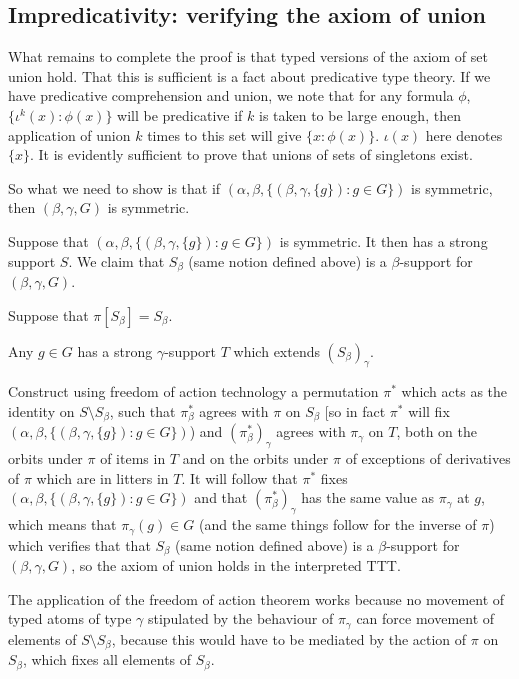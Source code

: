 \documentclass[112pt]{article}
\begin{document}
\newpage
\subsection{Impredicativity:  verifying the axiom of union}

What remains to complete the proof is that typed versions of the axiom of set union hold.  That this is sufficient is a fact about predicative type theory.
If we have predicative comprehension and union, we note that for any formula $\phi$, $\{\iota^k(x):\phi(x)\}$ will be predicative if $k$ is taken to be large enough, then application of union $k$ times to this set will give $\{x:\phi(x)\}$.  $\iota(x)$ here denotes $\{x\}$.  It is evidently sufficient to prove that unions of sets of singletons exist.

So what we need to show is that if $(\alpha,\beta,\{(\beta,\gamma,\{g\}):g \in G\})$ is symmetric, then $(\beta,\gamma,G)$ is symmetric.

Suppose that $(\alpha,\beta,\{(\beta,\gamma,\{g\}):g \in G\})$ is symmetric.  It then has a strong support $S$.  We claim that $S_\beta$ (same notion defined above) is a $\beta$-support for $(\beta,\gamma,G)$.

Suppose that $\pi[S_\beta]=S_\beta$.  

Any $g \in G$ has a strong $\gamma$-support $T$ which extends $(S_\beta)_\gamma$.

Construct using freedom of action technology a permutation $\pi^*$ which acts as the identity on $S \setminus S_\beta$, such that $\pi^*_\beta$ agrees with $\pi$ on $S_\beta$ [so in fact $\pi^*$ will fix $(\alpha,\beta,\{(\beta,\gamma,\{g\}):g \in G\})$) and $(\pi^*_\beta)_\gamma$ agrees with $\pi_\gamma$ on $T$, both on the orbits under $\pi$ of items in $T$ and on the orbits under $\pi$ of exceptions of derivatives of $\pi$ which are in litters in $T$.  It will follow that $\pi^*$ fixes $(\alpha,\beta,\{(\beta,\gamma,\{g\}):g \in G\})$ and that $(\pi^*_\beta)_\gamma$ has the same value as $\pi_\gamma$ at $g$, which means that $\pi_\gamma(g) \in G$ (and the same things follow for the inverse of $\pi$) which verifies that that $S_\beta$ (same notion defined above) is a $\beta$-support for $(\beta,\gamma,G)$, so the axiom of union holds in the interpreted TTT.

The application of the freedom of action theorem works because no movement of typed atoms of type $\gamma$ stipulated by the behaviour of $\pi_\gamma$ can force
movement of elements of $S \setminus S_\beta$, because this would have to be mediated by the action of $\pi$ on $S_\beta$, which fixes all elements of $S_\beta$.
\end{document}
